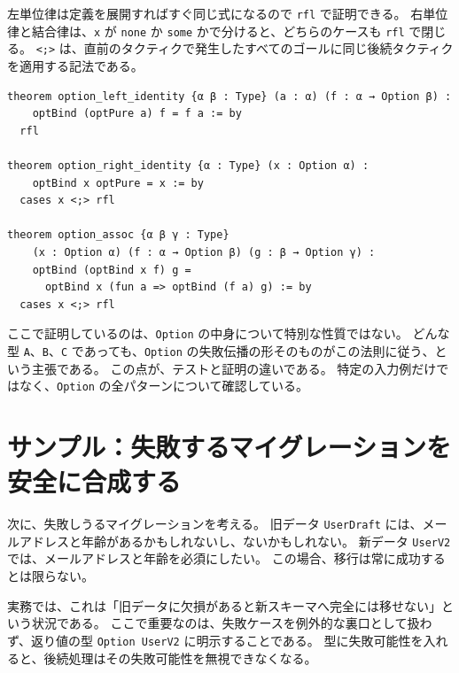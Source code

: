 \begin{leanbox}
左単位律は定義を展開すればすぐ同じ式になるので \texttt{rfl} で証明できる。
右単位律と結合律は、\texttt{x} が \texttt{none} か \texttt{some} かで分けると、どちらのケースも \texttt{rfl} で閉じる。
\texttt{<;>} は、直前のタクティクで発生したすべてのゴールに同じ後続タクティクを適用する記法である。
\end{leanbox}

\begin{listing}[htbp]
\begin{verbatim}
theorem option_left_identity {α β : Type} (a : α) (f : α → Option β) :
    optBind (optPure a) f = f a := by
  rfl

theorem option_right_identity {α : Type} (x : Option α) :
    optBind x optPure = x := by
  cases x <;> rfl

theorem option_assoc {α β γ : Type}
    (x : Option α) (f : α → Option β) (g : β → Option γ) :
    optBind (optBind x f) g =
      optBind x (fun a => optBind (f a) g) := by
  cases x <;> rfl
\end{verbatim}
\caption{Option のモナド則}
\label{lst:ch11_option_laws}
\end{listing}

ここで証明しているのは、\texttt{Option} の中身について特別な性質ではない。
どんな型 \texttt{A}、\texttt{B}、\texttt{C} であっても、\texttt{Option} の失敗伝播の形そのものがこの法則に従う、という主張である。
この点が、テストと証明の違いである。
特定の入力例だけではなく、\texttt{Option} の全パターンについて確認している。

\section{サンプル：失敗するマイグレーションを安全に合成する}

次に、失敗しうるマイグレーションを考える。
旧データ \texttt{UserDraft} には、メールアドレスと年齢があるかもしれないし、ないかもしれない。
新データ \texttt{UserV2} では、メールアドレスと年齢を必須にしたい。
この場合、移行は常に成功するとは限らない。

\begin{softwarebox}
実務では、これは「旧データに欠損があると新スキーマへ完全には移せない」という状況である。
ここで重要なのは、失敗ケースを例外的な裏口として扱わず、返り値の型 \texttt{Option UserV2} に明示することである。
型に失敗可能性を入れると、後続処理はその失敗可能性を無視できなくなる。
\end{softwarebox}

